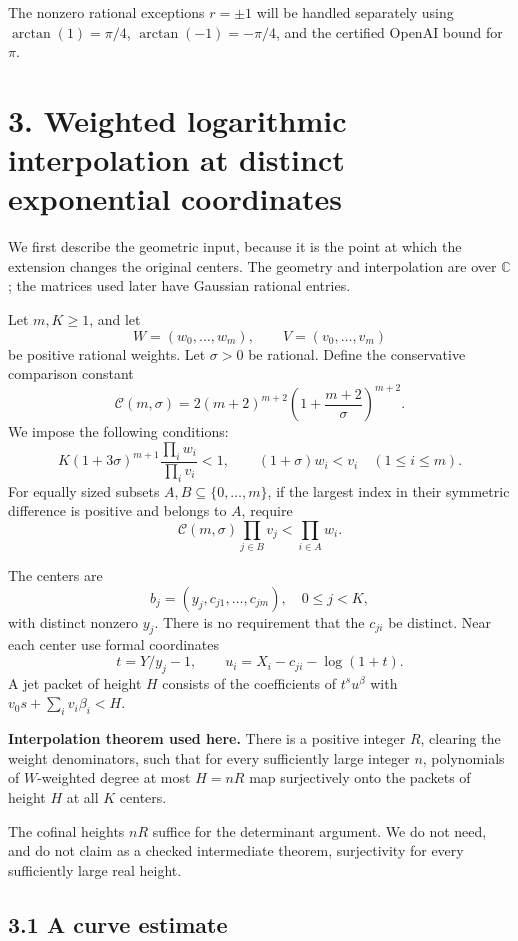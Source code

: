 \documentclass[11pt]{article}
\begin{document}
The nonzero rational exceptions \(r=\pm1\) will be handled separately
using \(\arctan(1)=\pi/4\), \(\arctan(-1)=-\pi/4\), and the certified
OpenAI bound for \(\pi\).

\section{3. Weighted logarithmic interpolation at distinct exponential
coordinates}\label{weighted-logarithmic-interpolation-at-distinct-exponential-coordinates}

We first describe the geometric input, because it is the point at which
the extension changes the original centers. The geometry and
interpolation are over \(\mathbb C\); the matrices used later have
Gaussian rational entries.

Let \(m,K\ge1\), and let \[
W=(w_0,\ldots,w_m),\qquad V=(v_0,\ldots,v_m)
\] be positive rational weights. Let \(\sigma>0\) be rational. Define
the conservative comparison constant \[
\mathcal C(m,\sigma)=
2(m+2)^{m+2}\left(1+\frac{m+2}{\sigma}\right)^{m+2}.
\] We impose the following conditions: \[
K(1+3\sigma)^{m+1}\frac{\prod_iw_i}{\prod_iv_i}<1,
\qquad
(1+\sigma)w_i<v_i\quad(1\le i\le m).
\tag{G1}
\] For equally sized subsets \(A,B\subseteq\{0,\ldots,m\}\), if the
largest index in their symmetric difference is positive and belongs to
\(A\), require \[
\mathcal C(m,\sigma)\prod_{j\in B}v_j
<\prod_{i\in A}w_i.
\tag{G2}
\]

The centers are \[
b_j=(y_j,c_{j1},\ldots,c_{jm}),\quad 0\le j<K,
\] with distinct nonzero \(y_j\). There is no requirement that the
\(c_{ji}\) be distinct. Near each center use formal coordinates \[
t=Y/y_j-1,\qquad
u_i=X_i-c_{ji}-\log(1+t).
\tag{G3}
\] A jet packet of height \(H\) consists of the coefficients of
\(t^su^\beta\) with \(v_0s+\sum_i v_i\beta_i<H\).

\textbf{Interpolation theorem used here.} There is a positive integer
\(R\), clearing the weight denominators, such that for every
sufficiently large integer \(n\), polynomials of \(W\)-weighted degree
at most \(H=nR\) map surjectively onto the packets of height \(H\) at
all \(K\) centers.

The cofinal heights \(nR\) suffice for the determinant argument. We do
not need, and do not claim as a checked intermediate theorem,
surjectivity for every sufficiently large real height.

\subsection{3.1 A curve estimate}\label{a-curve-estimate}
\end{document}
